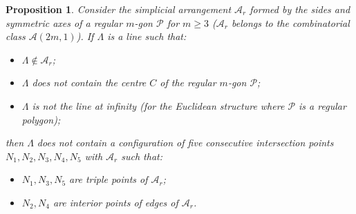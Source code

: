 \documentclass[a4paper,11pt,reqno]{amsart}
\newtheorem{prop}[thm]{Proposition}
\theoremstyle{definition}
\theoremstyle{remark}
\theoremstyle{definition}
\theoremstyle{definition}
\theoremstyle{definition}
\numberwithin{equation}{section}
\begin{document}
\begin{prop}\label{prop:configuration}
Consider the simplicial arrangement $\mathcal{A}_{r}$ formed by the sides and symmetric axes of a regular $m$-gon $\mathcal{P}$ for $m \geq 3$ ($\mathcal{A}_{r}$ belongs to the combinatorial class $\mathcal{A}(2m,1)$). If $\Lambda$ is a line such that:
\begin{itemize}
    \item $\Lambda \notin \mathcal{A}_{r}$;
    \item $\Lambda$ does not contain the centre $C$ of the regular $m$-gon $\mathcal{P}$;
    \item $\Lambda$ is not the line at infinity (for the Euclidean structure where $\mathcal{P}$ is a regular polygon);
\end{itemize}
then $\Lambda$ does not contain a configuration of five consecutive intersection points $N_{1},N_{2},N_{3},N_{4},N_{5}$ with $\mathcal{A}_{r}$ such that:
\begin{itemize}
    \item $N_{1},N_{3},N_{5}$ are triple points of $\mathcal{A}_{r}$;
    \item $N_{2},N_{4}$ are interior points of edges of $\mathcal{A}_{r}$.
\end{itemize}
\end{prop}
\end{document}
